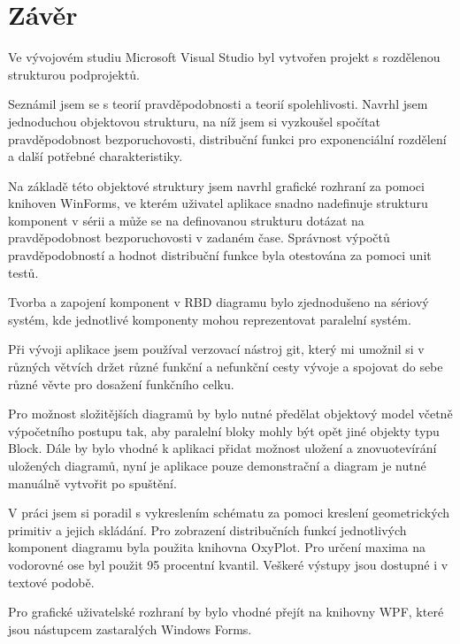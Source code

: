 \documentclass[FM,RP]{tulthesis}
\begin{document}
\chapter{Závěr}
    Ve vývojovém studiu Microsoft Visual Studio byl vytvořen projekt s rozdělenou strukturou podprojektů.

    Seznámil jsem se s teorií pravděpodobnosti a teorií spolehlivosti.
    Navrhl jsem jednoduchou objektovou strukturu, na níž jsem si vyzkoušel spočítat pravděpodobnost bezporuchovosti, 
    distribuční funkci pro exponenciální rozdělení a další potřebné charakteristiky.

    Na základě této objektové struktury jsem navrhl grafické rozhraní za pomoci knihoven WinForms, 
    ve kterém uživatel aplikace snadno nadefinuje strukturu komponent v sérii a může se na definovanou strukturu dotázat
    na pravděpodobnost bezporuchovosti v zadaném čase. Správnost výpočtů pravděpodobností a hodnot distribuční funkce byla otestována za pomoci unit testů.

    Tvorba a zapojení komponent v RBD diagramu bylo zjednodušeno na sériový systém, kde jednotlivé komponenty mohou reprezentovat paralelní systém.

    Při vývoji aplikace jsem používal verzovací nástroj git, který mi umožnil si v různých větvích držet různé funkční a nefunkční cesty vývoje a spojovat do sebe různé
    věvte pro dosažení funkčního celku. \cite{7}

    Pro možnost složitějších diagramů by bylo nutné předělat objektový model včetně výpočetního postupu tak, aby paralelní bloky mohly být opět jiné objekty typu Block.
    Dále by bylo vhodné k aplikaci přidat možnost uložení a znovuotevírání uložených diagramů,
    nyní je aplikace pouze demonstrační a diagram je nutné manuálně vytvořit po spuštění.

    V práci jsem si poradil s vykreslením schématu za pomoci kreslení geometrických primitiv a jejich skládání. 
    Pro zobrazení distribučních funkcí jednotlivých komponent diagramu byla použita knihovna OxyPlot. Pro určení maxima na vodorovné ose byl použit 95 procentní kvantil.
    Veškeré výstupy jsou dostupné i v textové podobě.

    Pro grafické uživatelské rozhraní by bylo vhodné přejít na knihovny WPF, které jsou nástupcem zastaralých Windows Forms.
\end{document}
